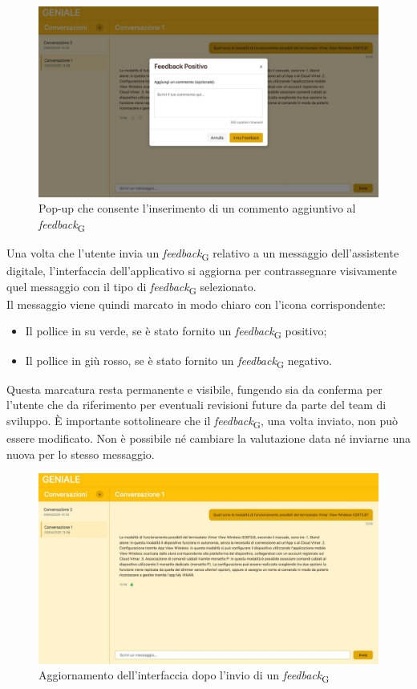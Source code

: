 \begin{figure}[H]
\centering
\includegraphics[width=1\textwidth]{contents/img/feedback_comment.jpg}
\caption{Pop-up che consente l'inserimento di un commento aggiuntivo al \textit{feedback}\textsubscript{G}}
\end{figure}
Una volta che l’utente invia un \textit{feedback}\textsubscript{G} relativo a un messaggio dell’assistente digitale, l’interfaccia dell’applicativo si aggiorna per contrassegnare visivamente quel messaggio con il tipo di \textit{feedback}\textsubscript{G} selezionato. \\
Il messaggio viene quindi marcato in modo chiaro con l’icona corrispondente:
\begin{itemize}
    \item Il pollice in su verde, se è stato fornito un \textit{feedback}\textsubscript{G} positivo;
    \item Il pollice in giù rosso, se è stato fornito un \textit{feedback}\textsubscript{G} negativo.
\end{itemize}
Questa marcatura resta permanente e visibile, fungendo sia da conferma per l’utente che da riferimento per eventuali revisioni future da parte del team di sviluppo. È importante sottolineare che il \textit{feedback}\textsubscript{G}, una volta inviato, non può essere modificato. Non è possibile né cambiare la valutazione data né inviarne una nuova per lo stesso messaggio.
\begin{figure}[H]
\centering
\includegraphics[width=1\textwidth]{contents/img/feedback_result.jpg}
\caption{Aggiornamento dell'interfaccia dopo l'invio di un \textit{feedback}\textsubscript{G}}
\end{figure}

